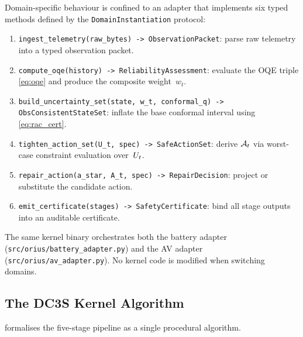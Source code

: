 Domain-specific behaviour is confined to an adapter that implements six typed
methods defined by the \texttt{DomainInstantiation} protocol:
\begin{enumerate}[nosep]
  \item \texttt{ingest\_telemetry(raw\_bytes) -> ObservationPacket}: parse raw
        telemetry into a typed observation packet.
  \item \texttt{compute\_oqe(history) -> ReliabilityAssessment}: evaluate the OQE
        triple \cref{eq:oqe} and produce the composite weight~$w_t$.
  \item \texttt{build\_uncertainty\_set(state, w\_t, conformal\_q) ->
        ObsConsistentStateSet}: inflate the base conformal interval using
        \cref{eq:rac_cert}.
  \item \texttt{tighten\_action\_set(U\_t, spec) -> SafeActionSet}: derive $\mathcal{A}_t$
        via worst-case constraint evaluation over~$U_t$.
  \item \texttt{repair\_action(a\_star, A\_t, spec) -> RepairDecision}: project or
        substitute the candidate action.
  \item \texttt{emit\_certificate(stages) -> SafetyCertificate}: bind all stage
        outputs into an auditable certificate.
\end{enumerate}

The same \dcs{} kernel binary orchestrates both the battery adapter
(\texttt{src/orius/battery\_adapter.py}) and the AV adapter
(\texttt{src/orius/av\_adapter.py}).  No kernel code is modified when switching
domains.

\subsection{The DC3S Kernel Algorithm}

 formalises the five-stage pipeline as a single procedural algorithm.


